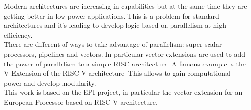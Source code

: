 \summary
\english



Modern architectures are increasing in capabilities but at the same time they are getting better in low-power applications.
This  is a problem for standard architectures and it's leading to develop logic based on parallelism at high efficiency.\\

There are different of ways to take advantage of parallelism: super-scalar processors, pipelines and vectors. In particular vector extensions are used to add the power of parallelism to a simple RISC architecture. A famous example is the V-Extension of the RISC-V architecture. This allows to gain computational power and develop modularity.\\

This work is based on the EPI project, in particular the vector extension for an European Processor based on RISC-V architecture.\\








\bigskip
